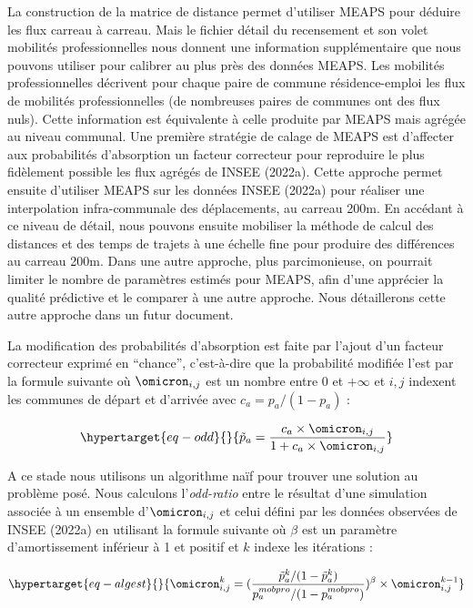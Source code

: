 \documentclass[
  10pt,
  a4paper,
  numbers=noendperiod,
  DIV=9]{scrreprt}
\begin{document}
La construction de la matrice de distance permet d'utiliser MEAPS pour
déduire les flux carreau à carreau. Mais le fichier détail du
recensement et son volet mobilités professionnelles nous donnent une
information supplémentaire que nous pouvons utiliser pour calibrer au
plus près des données MEAPS. Les mobilités professionnelles décrivent
pour chaque paire de commune résidence-emploi les flux de mobilités
professionnelles (de nombreuses paires de communes ont des flux nuls).
Cette information est équivalente à celle produite par MEAPS mais
agrégée au niveau communal. Une première stratégie de calage de MEAPS
est d'affecter aux probabilités d'absorption un facteur correcteur pour
reproduire le plus fidèlement possible les flux agrégés de INSEE
(2022a). Cette approche permet ensuite d'utiliser MEAPS sur les données
INSEE (2022a) pour réaliser une interpolation infra-communale des
déplacements, au carreau 200m. En accédant à ce niveau de détail, nous
pouvons ensuite mobiliser la méthode de calcul des distances et des
temps de trajets à une échelle fine pour produire des différences au
carreau 200m. Dans une autre approche, plus parcimonieuse, on pourrait
limiter le nombre de paramètres estimés pour MEAPS, afin d'une apprécier
la qualité prédictive et le comparer à une autre approche. Nous
détaillerons cette autre approche dans un futur document.

La modification des probabilités d'absorption est faite par l'ajout d'un
facteur correcteur exprimé en ``chance'', c'est-à-dire que la
probabilité modifiée l'est par la formule suivante où \(\omicron_{i,j}\)
est un nombre entre \(0\) et \(+\infty\) et \(i,j\) indexent les
communes de départ et d'arrivée avec \(c_a = p_a/(1-p_a)\) :

\begin{equation}\protect\hypertarget{eq-odd}{}{
\tilde{p}_a = \frac{c_a \times \omicron_{i,j}} {1+c_a \times \omicron_{i,j}} 
}\label{eq-odd}\end{equation}

A ce stade nous utilisons un algorithme naïf pour trouver une solution
au problème posé. Nous calculons l'\emph{odd-ratio} entre le résultat
d'une simulation associée à un ensemble d'\(\omicron_{i,j}\) et celui
défini par les données observées de INSEE (2022a) en utilisant la
formule suivante où \(\beta\) est un paramètre d'amortissement inférieur
à 1 et positif et \(k\) indexe les itérations :

\begin{equation}\protect\hypertarget{eq-algest}{}{
\omicron^k_{i,j} = (\frac{\tilde{p}^k_a/(1-\tilde{p}^k_a)}{
p^{mobpro}_a/(1-p^{mobpro}_a)})^\beta \times \omicron^{k-1}_{i,j}
}\label{eq-algest}\end{equation}
\end{document}
